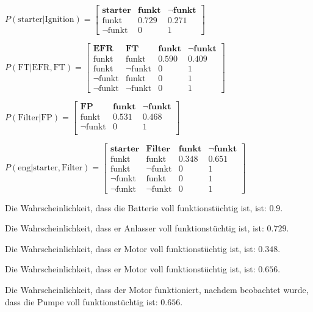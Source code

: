 \documentclass[]{article}
\begin{document}
$
P(\text{starter}|\text{Ignition})=
\begin{bmatrix}
\textbf{starter} &\textbf{funkt} & \neg\textbf{funkt}\\
\text{funkt} & 0.729& 0.271\\
\neg\text{funkt}& 0  & 1
\end{bmatrix}
$

$
P(\text{FT}|\text{EFR},\text{FT})=
\begin{bmatrix}
\textbf{EFR} & \textbf{FT} &\textbf{funkt} & \neg\textbf{funkt}\\
\text{funkt} & \text{funkt} & 0.590& 0.409\\
\text{funkt} & \neg \text{funkt} & 0 & 1\\
\neg \text{funkt} & \text{funkt} & 0 & 1\\
\neg \text{funkt} & \neg\text{funkt}& 0  & 1
\end{bmatrix}
$

$
P(\text{Filter}|\text{FP})=
\begin{bmatrix}
\textbf{FP} &\textbf{funkt} & \neg\textbf{funkt}\\
\text{funkt} & 0.531& 0.468\\
\neg \text{funkt} & 0 & 1\\
\end{bmatrix}
$

$
P(\text{eng}|\text{starter},\text{Filter})=
\begin{bmatrix}
\textbf{starter} & \textbf{Filter} &\textbf{funkt} & \neg\textbf{funkt}\\
\text{funkt} & \text{funkt} & 0.348 & 0.651\\
\text{funkt} & \neg \text{funkt} & 0 & 1\\
\neg \text{funkt} & \text{funkt} & 0 & 1\\
\neg \text{funkt} & \neg\text{funkt}& 0  & 1
\end{bmatrix}
$

Die Wahrscheinlichkeit, dass die Batterie voll funktionstüchtig ist, ist: $0.9$.

Die Wahrscheinlichkeit, dass er Anlasser voll funktionstüchtig ist, ist: $0.729$.

Die Wahrscheinlichkeit, dass er Motor voll funktionstüchtig ist, ist: $0.348$.

Die Wahrscheinlichkeit, dass er Motor voll funktionstüchtig ist, ist: $0.656$.

Die Wahrscheinlichkeit, dass der Motor funktioniert, nachdem beobachtet wurde, dass die Pumpe voll funktionstüchtig ist: $0.656$.
\end{document}

